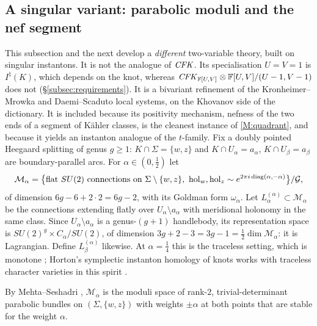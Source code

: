 

\subsection{A singular variant: parabolic moduli and the nef segment}\label{subsec:symp}
This subsection and the next develop a \emph{different} two-variable theory, built on singular
instantons.  It is not the analogue of $\mathit{CFK}$.  Its specialisation $U=V=1$ is $I^\natural(K)$, which
depends on the knot, whereas $\mathit{CFK}_{\mathbb{F}[U,V]}\otimes\mathbb{F}[U,V]/(U-1,V-1)$ does not (\S\ref{subsec:requirements}).
It is a bivariant refinement of the Kronheimer--Mrowka and Daemi--Scaduto local systems, on the Khovanov
side of the dictionary.  It is included because its positivity mechanism, nefness of the two ends of a
segment of Kähler classes, is the cleanest instance of \ref{M:quadrant}, and because it yields an
instanton analogue of the $t$-family.
Fix a doubly pointed Heegaard splitting of genus $g\ge1$: $K\cap\Sigma=\{w,z\}$ and $K\cap U_\alpha=a_\alpha$,
$K\cap U_\beta=a_\beta$ are boundary-parallel arcs.  For $\alpha\in(0,\tfrac12)$ let
\[
\mathcal M_\alpha=\big\{\text{flat }SU(2)\text{ connections on }\Sigma\setminus\{w,z\},\ \mathrm{hol}_w,\mathrm{hol}_z\sim e^{2\pi i\,\mathrm{diag}(\alpha,-\alpha)}\big\}/\cG,
\]
of dimension $6g-6+2\cdot2=6g-2$, with its Goldman form $\omega_\alpha$.  Let
$L_\alpha^{(\alpha)}\subset\mathcal M_\alpha$ be the connections extending flatly over $U_\alpha\setminus a_\alpha$ with
meridional holonomy in the same class.  Since $U_\alpha\setminus a_\alpha$ is a genus-$(g+1)$ handlebody, its
representation space is $SU(2)^g\times C_\alpha/SU(2)$, of dimension $3g+2-3=3g-1=\tfrac12\dim\mathcal M_\alpha$:
it is Lagrangian.  Define $L_\beta^{(\alpha)}$ likewise.  At $\alpha=\tfrac14$ this is the traceless
setting, which is monotone \cite{KM-knothom}; Horton's symplectic instanton homology of knots works with
traceless character varieties in this spirit \cite{Horton}.

By Mehta--Seshadri \cite{MS}, $\mathcal M_\alpha$ is the moduli space of rank-$2$, trivial-determinant
parabolic bundles on $(\Sigma,\{w,z\})$ with weights $\pm\alpha$ at both points that are stable for the
weight $\alpha$.

